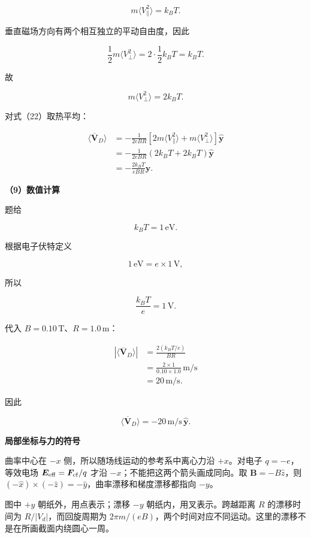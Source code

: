 \documentclass[12pt,a4paper,UTF8]{ctexart}
\begin{document}
\[
m\langle V_{\parallel}^2\rangle=k_BT.
\tag{24}
\]

垂直磁场方向有两个相互独立的平动自由度，因此

\[
\frac12m\langle V_\perp^2\rangle
=2\cdot\frac12k_BT
=k_BT.
\tag{25}
\]

故

\[
m\langle V_\perp^2\rangle=2k_BT.
\tag{26}
\]

对式（22）取热平均：

\[
\begin{aligned}
\langle\overline{\boldsymbol V}_D\rangle
&=-\frac{1}{2eBR}
\left[
2m\langle V_{\parallel}^2\rangle
+m\langle V_\perp^2\rangle
\right]\hat{\boldsymbol y}\\
&=-\frac{1}{2eBR}
\left(2k_BT+2k_BT\right)
\hat{\boldsymbol y}\\
&=\boxed{
-\frac{2k_BT}{eBR}
\hat{\boldsymbol y}
}.
\end{aligned}
\tag{27}
\]

\textbf{（9）数值计算}

题给

\[
k_BT=1\,\mathrm{eV}.
\]

根据电子伏特定义

\[
1\,\mathrm{eV}=e\times1\,\mathrm V,
\]

所以

\[
\frac{k_BT}{e}=1\,\mathrm V.
\tag{28}
\]

代入 \(B=0.10\,\mathrm T\)、\(R=1.0\,\mathrm m\)：

\[
\begin{aligned}
\left|\langle\overline{\boldsymbol V}_D\rangle\right|
&=\frac{2(k_BT/e)}{BR}\\
&=\frac{2\times1}{0.10\times1.0}\,\mathrm{m/s}\\
&=20\,\mathrm{m/s}.
\end{aligned}
\]

因此

\[
\boxed{
\langle\overline{\boldsymbol V}_D\rangle
=-20\,\mathrm{m/s}\,\hat{\boldsymbol y}
}.
\tag{29}
\]

\textbf{局部坐标与力的符号}

曲率中心在 \(-x\) 侧，所以随场线运动的参考系中离心力沿 \(+x\)。对电子
\(q=-e\)，等效电场 \(\bm E_{\rm eff}=\bm F_{\rm cf}/q\) 才沿
\(-x\)；不能把这两个箭头画成同向。取 \(\bm B=-B\hat z\)，则
\((-\hat x)\times(-\hat z)=-\hat y\)，曲率漂移和梯度漂移都指向 \(-y\)。

图中 \(+y\) 朝纸外，用点表示；漂移 \(-y\) 朝纸内，用叉表示。跨越距离
\(R\) 的漂移时间为 \(R/|V_d|\)，而回旋周期为
\(2\pi m/(eB)\)，两个时间对应不同运动。这里的漂移不是在所画截面内绕圆心一周。
\end{document}
